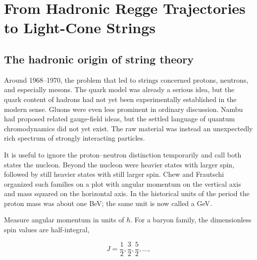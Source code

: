 \chapter{From Hadronic Regge Trajectories to Light-Cone Strings}


\section{The hadronic origin of string theory}

Around 1968--1970, the problem that led to strings concerned protons,
neutrons, and especially mesons. The quark model was already a serious idea,
but the quark content of hadrons had not yet been experimentally established
in the modern sense. Gluons were even less prominent in ordinary discussion.
Nambu had proposed related gauge-field ideas, but the settled language of
quantum chromodynamics did not yet exist. The raw material was instead an
unexpectedly rich spectrum of strongly interacting particles.

It is useful to ignore the proton--neutron distinction temporarily and call
both states the nucleon. Beyond the nucleon were heavier states with larger
spin, followed by still heavier states with still larger spin. Chew and
Frautschi organized such families on a plot with angular momentum on the
vertical axis and mass squared on the horizontal axis. In the historical
units of the period the proton mass was about one BeV; the same unit is now
called a GeV.

Measure angular momentum in units of \(\hbar\). For a baryon family, the
dimensionless spin values are half-integral,

\begin{equation}
  J=\frac12,\frac32,\frac52,\ldots,
\end{equation}

